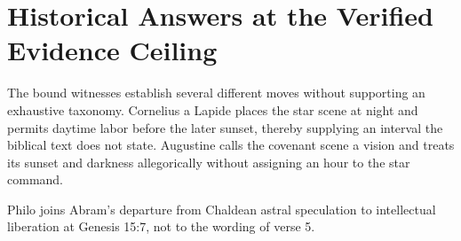 \section{Historical Answers at the Verified Evidence Ceiling}

The bound witnesses establish several different moves without supporting an
exhaustive taxonomy. Cornelius a Lapide places the star scene at night and
permits daytime labor before the later sunset, thereby supplying an interval
the biblical text does not state. Augustine calls the covenant scene a vision
and treats its sunset and darkness allegorically without assigning an hour to
the star command.

Philo joins Abram's departure from Chaldean astral speculation to intellectual
liberation at Genesis 15:7, not to the wording of verse 5.

